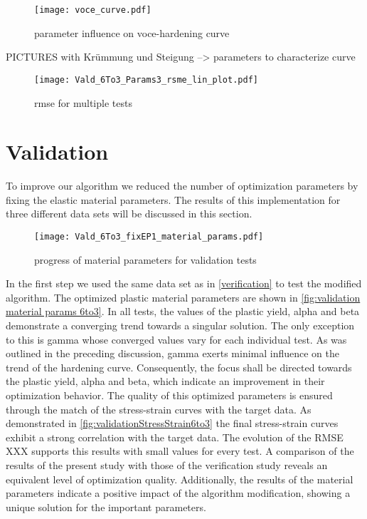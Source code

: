    
   \begin{figure}[H]
		\centering
        \texttt{[image: voce\_curve.pdf]}
		\caption{parameter influence on voce-hardening curve}
		\label{fig:Parameter influence on VOCE-hardening curve}
	\end{figure}
    PICTURES with Krümmung und Steigung --> parameters to characterize curve

    \begin{figure}[H]
		\centering
        \texttt{[image: Vald\_6To3\_Params3\_rsme\_lin\_plot.pdf]}
		\caption{rmse for multiple tests}
		\label{fig:rmse progress}
	\end{figure}

    
    \section{Validation}\label{sec: validation}
    To improve our algorithm we reduced the number of optimization parameters by fixing the elastic material parameters. The results of this implementation for three different data sets will be discussed in this section.

    \begin{figure}[H]
		\centering
        \texttt{[image: Vald\_6To3\_fixEP1\_material\_params.pdf]}
		\caption{progress of material parameters for validation tests}
		\label{fig:validation material params 6to3}
	\end{figure}

    In the first step we used the same data set as in \autoref{verification} to test the modified algorithm. The optimized plastic material parameters are shown in \autoref{fig:validation material params 6to3}.  In all tests, the values of the plastic yield, alpha and beta demonstrate a converging trend towards a singular solution. The only exception to this is gamma whose converged values vary for each individual test. As was outlined in the preceding discussion, gamma exerts minimal influence on the trend of the hardening curve. Consequently, the focus shall be directed towards the plastic yield, alpha and beta, which indicate an improvement in their optimization behavior.
    The quality of this optimized parameters is ensured through the match of the stress-strain curves with the target data. As demonstrated in \autoref{fig:validationStressStrain6to3} the final stress-strain curves exhibit a strong correlation with the target data. The evolution of the RMSE XXX supports this results with small values for every test. A comparison of the results of the present study with those of the verification study reveals an equivalent level of optimization quality. Additionally, the results of the material parameters indicate a positive impact of the algorithm modification, showing a unique solution for the important parameters. 
     
